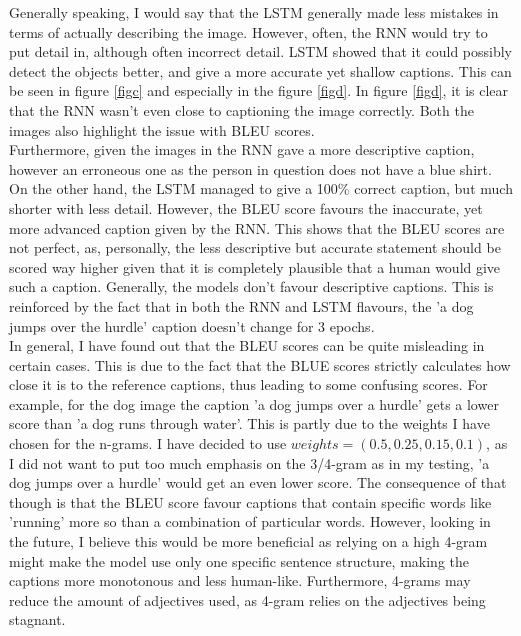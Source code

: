 \documentclass{article}
\begin{document}
    Generally speaking, I would say that the LSTM generally made less mistakes in terms of actually describing the image. However, often, the RNN would try to put detail in, although often incorrect detail. LSTM showed that it could possibly detect the objects better, and give a more accurate yet shallow captions. This can be seen in figure \ref{figc} and especially in the figure \ref{figd}. In figure \ref{figd}, it is clear that the RNN wasn't even close to captioning the image correctly. Both the images also highlight the issue with BLEU scores.\\
    
    Furthermore, given the images in the RNN gave a more descriptive caption, however an erroneous one as the person in question does not have a blue shirt. On the other hand, the LSTM managed to give a 100\% correct caption, but much shorter with less detail. However, the BLEU score favours the inaccurate, yet more advanced caption given by the RNN. This shows that the BLEU scores are not perfect, as, personally, the less descriptive but accurate statement should be scored way higher given that it is completely plausible that a human would give such a caption. Generally, the models don't favour descriptive captions. This is reinforced by the fact that in both the RNN and LSTM flavours, the 'a dog jumps over the hurdle' caption doesn't change for 3 epochs.\\

    In general, I have found out that the BLEU scores can be quite misleading in certain cases. This is due to the fact that the BLUE scores strictly calculates how close it is to the reference captions, thus leading to some confusing scores. For example, for the dog image the caption 'a dog jumps over a hurdle' gets a lower score than 'a dog runs through water'. This is partly due to the weights I have chosen for the n-grams. I have decided to use $weights=(0.5, 0.25, 0.15, 0.1)$, as I did not want to put too much emphasis on the 3/4-gram as in my testing, 'a dog jumps over a hurdle' would get an even lower score. The consequence of that though is that the BLEU score favour captions that contain specific words like 'running' more so than a combination of particular words. However, looking in the future, I believe this would be more beneficial as relying on a high 4-gram might make the model use only one specific sentence structure, making the captions more monotonous and less human-like. Furthermore, 4-grams may reduce the amount of adjectives used, as 4-gram relies on the adjectives being stagnant.\\
\end{document}

